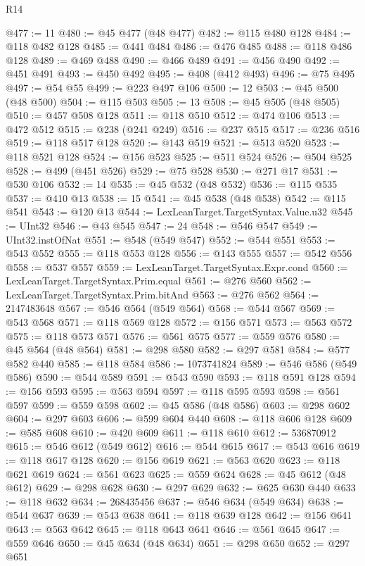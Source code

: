 \begin{lexlean}{R14}
\begin{coremodule}
@477 := 11
@480 := @45 @477 (@48 @477)
@482 := @115 @480 @128
@484 := @118 @482 @128
@485 := @441 @484
@486 := @476 @485
@488 := @118 @486 @128
@489 := @469 @488
@490 := @466 @489
@491 := @456 @490
@492 := @451 @491
@493 := @450 @492
@495 := @408 (@412 @493)
@496 := @75 @495
@497 := @54 @55
@499 := @223 @497 @106
@500 := 12
@503 := @45 @500 (@48 @500)
@504 := @115 @503
@505 := 13
@508 := @45 @505 (@48 @505)
@510 := @457 @508 @128
@511 := @118 @510
@512 := @474 @106
@513 := @472 @512
@515 := @238 (@241 @249)
@516 := @237 @515
@517 := @236 @516
@519 := @118 @517 @128
@520 := @143 @519
@521 := @513 @520
@523 := @118 @521 @128
@524 := @156 @523
@525 := @511 @524
@526 := @504 @525
@528 := @499 (@451 @526)
@529 := @75 @528
@530 := @271 @17
@531 := @530 @106
@532 := 14
@535 := @45 @532 (@48 @532)
@536 := @115 @535
@537 := @410 @13
@538 := 15
@541 := @45 @538 (@48 @538)
@542 := @115 @541
@543 := @120 @13
@544 := LexLeanTarget.TargetSyntax.Value.u32
@545 := UInt32
@546 := @43 @545
@547 := 24
@548 := @546 @547
@549 := UInt32.instOfNat
@551 := @548 (@549 @547)
@552 := @544 @551
@553 := @543 @552
@555 := @118 @553 @128
@556 := @143 @555
@557 := @542 @556
@558 := @537 @557
@559 := LexLeanTarget.TargetSyntax.Expr.cond
@560 := LexLeanTarget.TargetSyntax.Prim.equal
@561 := @276 @560
@562 := LexLeanTarget.TargetSyntax.Prim.bitAnd
@563 := @276 @562
@564 := 2147483648
@567 := @546 @564 (@549 @564)
@568 := @544 @567
@569 := @543 @568
@571 := @118 @569 @128
@572 := @156 @571
@573 := @563 @572
@575 := @118 @573 @571
@576 := @561 @575
@577 := @559 @576
@580 := @45 @564 (@48 @564)
@581 := @298 @580
@582 := @297 @581
@584 := @577 @582 @440
@585 := @118 @584
@586 := 1073741824
@589 := @546 @586 (@549 @586)
@590 := @544 @589
@591 := @543 @590
@593 := @118 @591 @128
@594 := @156 @593
@595 := @563 @594
@597 := @118 @595 @593
@598 := @561 @597
@599 := @559 @598
@602 := @45 @586 (@48 @586)
@603 := @298 @602
@604 := @297 @603
@606 := @599 @604 @440
@608 := @118 @606 @128
@609 := @585 @608
@610 := @420 @609
@611 := @118 @610
@612 := 536870912
@615 := @546 @612 (@549 @612)
@616 := @544 @615
@617 := @543 @616
@619 := @118 @617 @128
@620 := @156 @619
@621 := @563 @620
@623 := @118 @621 @619
@624 := @561 @623
@625 := @559 @624
@628 := @45 @612 (@48 @612)
@629 := @298 @628
@630 := @297 @629
@632 := @625 @630 @440
@633 := @118 @632
@634 := 268435456
@637 := @546 @634 (@549 @634)
@638 := @544 @637
@639 := @543 @638
@641 := @118 @639 @128
@642 := @156 @641
@643 := @563 @642
@645 := @118 @643 @641
@646 := @561 @645
@647 := @559 @646
@650 := @45 @634 (@48 @634)
@651 := @298 @650
@652 := @297 @651

\end{coremodule}
\end{lexlean}
